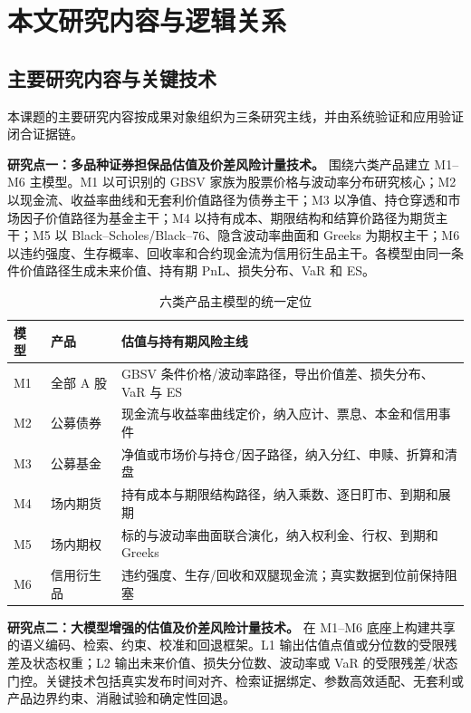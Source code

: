 \section{本文研究内容与逻辑关系}

\subsection{主要研究内容与关键技术}

本课题的主要研究内容按成果对象组织为三条研究主线，并由系统验证和应用验证闭合证据链。

\textbf{研究点一：多品种证券担保品估值及价差风险计量技术。}
围绕六类产品建立 M1--M6 主模型。M1 以可识别的 GBSV 家族为股票价格与波动率分布研究核心；M2 以现金流、收益率曲线和无套利价值路径为债券主干；M3 以净值、持仓穿透和市场因子价值路径为基金主干；M4 以持有成本、期限结构和结算价路径为期货主干；M5 以 Black--Scholes/Black--76、隐含波动率曲面和 Greeks 为期权主干；M6 以违约强度、生存概率、回收率和合约现金流为信用衍生品主干。各模型由同一条件价值路径生成未来价值、持有期 PnL、损失分布、VaR 和 ES。

\begin{table}[htbp]
  \centering
  \caption{六类产品主模型的统一定位}
  \label{tab:m1-m6-overview}
  \ReportTableText
  \begin{tabularx}{\textwidth}{@{}p{3.2em}p{7.2em}X@{}}
    \toprule
    模型 & 产品 & 估值与持有期风险主线 \\
    \midrule
    M1 & 全部 A 股 & GBSV 条件价格/波动率路径，导出价值差、损失分布、VaR 与 ES \\
    M2 & 公募债券 & 现金流与收益率曲线定价，纳入应计、票息、本金和信用事件 \\
    M3 & 公募基金 & 净值或市场价与持仓/因子路径，纳入分红、申赎、折算和清盘 \\
    M4 & 场内期货 & 持有成本与期限结构路径，纳入乘数、逐日盯市、到期和展期 \\
    M5 & 场内期权 & 标的与波动率曲面联合演化，纳入权利金、行权、到期和 Greeks \\
    M6 & 信用衍生品 & 违约强度、生存/回收和双腿现金流；真实数据到位前保持阻塞 \\
    \bottomrule
  \end{tabularx}
\end{table}

\textbf{研究点二：大模型增强的估值及价差风险计量技术。}
在 M1--M6 底座上构建共享的语义编码、检索、约束、校准和回退框架。L1 输出估值点值或分位数的受限残差及状态权重；L2 输出未来价值、损失分位数、波动率或 VaR 的受限残差/状态门控。关键技术包括真实发布时间对齐、检索证据绑定、参数高效适配、无套利或产品边界约束、消融试验和确定性回退。

